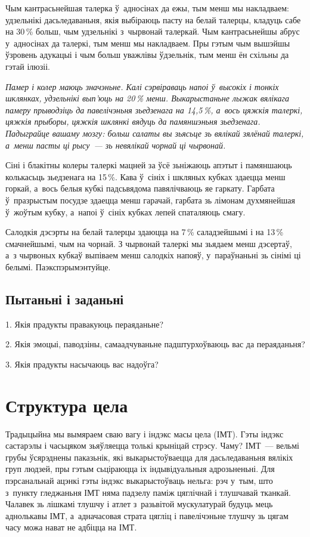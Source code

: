 Чым кантрасьнейшая талерка ў~адносінах да ежы, тым менш мы накладваем: удзельнікі дасьледаваньня, якія выбіраюць пасту на белай талерцы, кладуць сабе на 30\,\% больш, чым удзельнікі з~чырвонай талеркай. Чым кантрасьнейшы абрус у~адносінах да талеркі, тым менш мы накладваем. Пры гэтым чым вышэйшы ўзровень адукацыі і чым больш уважлівы ўдзельнік, тым менш ён схільны да гэтай ілюзіі.

\emph{Памер і колер маюць значэньне. Калі сэрвіраваць напоі ў~высокіх і тонкіх шклянках, удзельнікі вып'юць на 20\,\% менш. Выкарыстаньне лыжак вялікага памеру прыводзіць да павелічэньня зьедзенага на 14,5\,\%, а~вось цяжкія талеркі, цяжкія прыборы, цяжкія шклянкі вядуць да памяншэньня зьедзенага. Падыграйце вашаму мозгу: больш салаты вы зьясьце зь вялікай зялёнай талеркі, а~менш пасты ці рысу~--- зь невялікай чорнай ці чырвонай.}

Сіні і блакітны колеры талеркі мацней за ўсё зьніжаюць апэтыт і памяншаюць колькасьць зьедзенага на 15\,\%. Кава ў~сініх і шкляных кубках здаецца менш горкай, а~вось белыя кубкі падсьвядома павялічваюць яе гаркату. Гарбата ў~празрыстым посудзе здаецца менш гарачай, гарбата зь лімонам духмянейшая ў~жоўтым кубку, а~напоі ў~сініх кубках лепей спаталяюць смагу. 

Салодкія дэсэрты на белай талерцы здаюцца на 7\,\% саладзейшымі і на 13\,\% смачнейшымі, чым на чорнай. З чырвонай талеркі мы зьядаем менш дэсертаў, а~з чырвоных кубкаў выпіваем менш салодкіх напояў, у~параўнаньні зь сінімі ці белымі. Паэкспэрымэнтуйце.

\subsection*{Пытаньні і заданьні}

1. Якія прадукты правакуюць пераяданьне?

2. Якія эмоцыі, паводзіны, самаадчуваньне падштурхоўваюць вас да пераяданьня?

3. Якія прадукты насычаюць вас надоўга?


\section{Структура цела}

Традыцыйна мы вымяраем сваю вагу і індэкс масы цела (ІМТ). Гэты індэкс састарэлы і часьцяком зьяўляецца толькі крыніцай стрэсу. Чаму? ІМТ~--- вельмі грубы ўсярэднены паказьнік, які выкарыстоўваецца для дасьледаваньня вялікіх груп людзей, пры гэтым сьціраюцца іх індывідуальныя адрозьненьні. Для пэрсанальнай ацэнкі гэты індэкс выкарыстоўваць нельга: рэч у~тым, што з~пункту гледжаньня ІМТ няма падзелу паміж цяглічнай і тлушчавай тканкай. Чалавек зь лішкамі тлушчу і атлет з~разьвітой мускулатурай будуць мець аднолькавы ІМТ, а~адначасовая страта цягліц і павелічэньне тлушчу зь цягам часу можа нават не адбіцца на ІМТ. 


